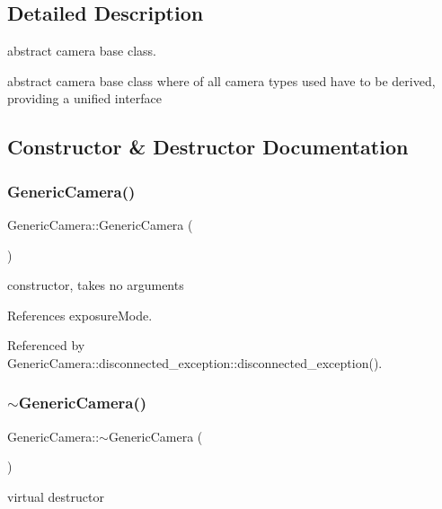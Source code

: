 \subsection{Detailed Description}
abstract camera base class. 

abstract camera base class where of all camera types used have to be derived, providing a unified interface 

\subsection{Constructor \& Destructor Documentation}
\mbox{\label{classGenericCamera_ace942cddd443bb28aeee5e49b10aa374}} 
\subsubsection{\texorpdfstring{Generic\+Camera()}{GenericCamera()}}
{\footnotesize\ttfamily Generic\+Camera\+::\+Generic\+Camera (\begin{DoxyParamCaption}{ }\end{DoxyParamCaption})}

constructor, takes no arguments 

References exposure\+Mode.



Referenced by Generic\+Camera\+::disconnected\+\_\+exception\+::disconnected\+\_\+exception().

\mbox{\label{classGenericCamera_a8a523a465c0db18b59b6113c6d308962}} 
\subsubsection{\texorpdfstring{$\sim$\+Generic\+Camera()}{~GenericCamera()}}
{\footnotesize\ttfamily Generic\+Camera\+::$\sim$\+Generic\+Camera (\begin{DoxyParamCaption}{ }\end{DoxyParamCaption})\hspace{0.3cm}{\ttfamily [virtual]}}

virtual destructor 

